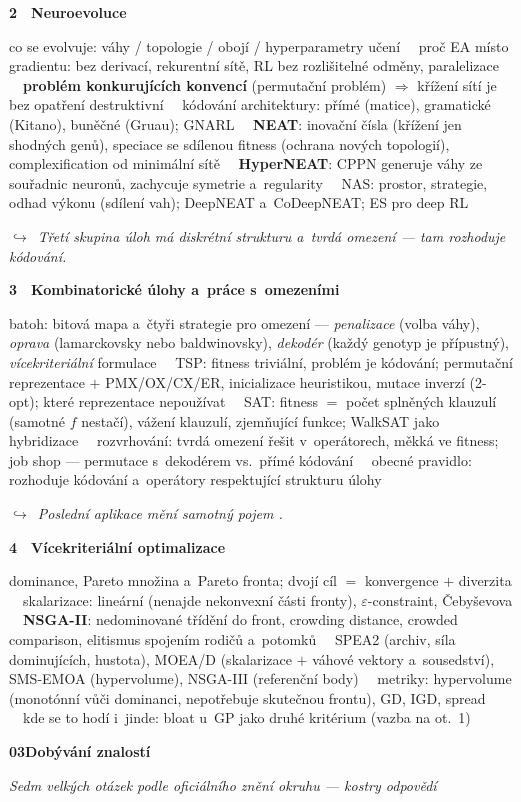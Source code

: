 \documentclass[11pt,a4paper]{article}
\newcommand{\tb}{\ \textcolor{defframe}{\textbullet}\ }
\newcommand{\blok}[2]{\par\addvspace{2.4mm}\noindent
  \textcolor{blokcol}{\textbf{#1}}\ \ \textbf{#2}\par\nobreak}
\newcommand{\tema}[1]{\par\nobreak\noindent #1\par}
\newcommand{\most}[1]{\par\nobreak\noindent
  {\small\itshape\textcolor{mostcol}{$\hookrightarrow$\ #1}}\par}
\newcommand{\okruh}[3]{%
  \clearpage
  \setcounter{section}{0}%
  \phantomsection
  \addcontentsline{toc}{part}{#1\quad #2}%
  \begingroup\centering
    {\Huge\bfseries #1\quad #2\par}\vspace{1.5mm}%
    {\small\itshape #3\par}%
  \endgroup
  \vspace{4mm}}
\begin{document}
\blok{2}{Neuroevoluce}
\tema{co se evolvuje: váhy / topologie / obojí / hyperparametry učení
\tb proč EA místo gradientu: bez derivací, rekurentní sítě, RL bez rozlišitelné odměny,
paralelizace
\tb \textbf{problém konkurujících konvencí} (permutační problém) $\Rightarrow$ křížení sítí
je bez opatření destruktivní
\tb kódování architektury: přímé (matice), gramatické (Kitano), buněčné (Gruau); GNARL
\tb \textbf{NEAT}: inovační čísla (křížení jen shodných genů), speciace se sdílenou fitness
(ochrana nových topologií), complexification od minimální sítě
\tb \textbf{HyperNEAT}: CPPN generuje váhy ze souřadnic neuronů, zachycuje symetrie
a~regularity
\tb NAS: prostor, strategie, odhad výkonu (sdílení vah); DeepNEAT a~CoDeepNEAT; ES pro deep
RL}
\most{Třetí skupina úloh má diskrétní strukturu a~tvrdá omezení --- tam rozhoduje kódování.}

\blok{3}{Kombinatorické úlohy a~práce s~omezeními}
\tema{batoh: bitová mapa a~čtyři strategie pro omezení --- \emph{penalizace} (volba váhy),
\emph{oprava} (lamarckovsky nebo baldwinovsky), \emph{dekodér} (každý genotyp je přípustný),
\emph{vícekriteriální} formulace
\tb TSP: fitness triviální, problém je kódování; permutační reprezentace $+$ PMX/OX/CX/ER,
inicializace heuristikou, mutace inverzí (2-opt); které reprezentace nepoužívat
\tb SAT: fitness $=$ počet splněných klauzulí (samotné $f$ nestačí), vážení klauzulí,
zjemňující funkce; WalkSAT jako hybridizace
\tb rozvrhování: tvrdá omezení řešit v~operátorech, měkká ve fitness; job shop --- permutace
s~dekodérem vs.\ přímé kódování
\tb obecné pravidlo: rozhoduje kódování a~operátory respektující strukturu úlohy}
\most{Poslední aplikace mění samotný pojem .}

\blok{4}{Vícekriteriální optimalizace}
\tema{dominance, Pareto množina a~Pareto fronta; dvojí cíl $=$ konvergence $+$ diverzita
\tb skalarizace: lineární (nenajde nekonvexní části fronty), $\varepsilon$-constraint,
Čebyševova
\tb \textbf{NSGA-II}: nedominované třídění do front, crowding distance, crowded comparison,
elitismus spojením rodičů a~potomků
\tb SPEA2 (archiv, síla dominujících, hustota), MOEA/D (skalarizace $+$ váhové vektory
a~sousedství), SMS-EMOA (hypervolume), NSGA-III (referenční body)
\tb metriky: hypervolume (monotónní vůči dominanci, nepotřebuje skutečnou frontu), GD, IGD,
spread
\tb kde se to hodí i~jinde: bloat u~GP jako druhé kritérium (vazba na ot.~1)}

\okruh{03}{Dobývání znalostí}{Sedm velkých otázek podle oficiálního znění okruhu
  --- kostry odpovědí}
\end{document}
